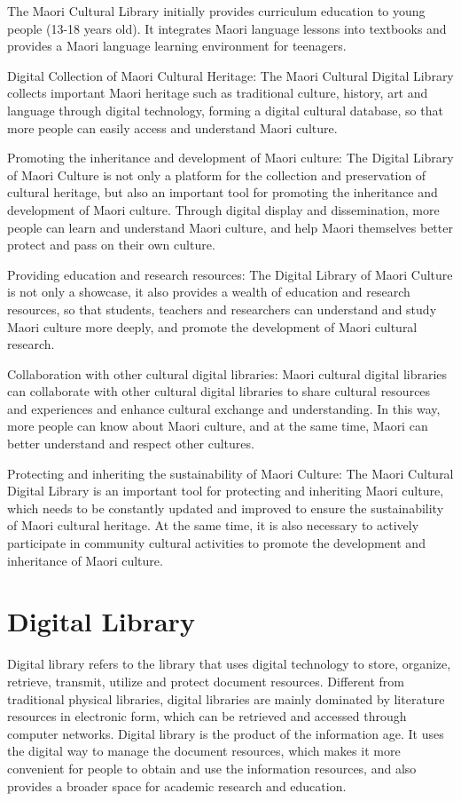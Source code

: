 The Maori Cultural Library initially provides curriculum education to young people (13-18 years old). It integrates Maori language lessons into textbooks and provides a Maori language learning environment for teenagers.

Digital Collection of Maori Cultural Heritage: The Maori Cultural Digital Library collects important Maori heritage such as traditional culture, history, art and language through digital technology, forming a digital cultural database, so that more people can easily access and understand Maori culture.

Promoting the inheritance and development of Maori culture: The Digital Library of Maori Culture is not only a platform for the collection and preservation of cultural heritage, but also an important tool for promoting the inheritance and development of Maori culture. Through digital display and dissemination, more people can learn and understand Maori culture, and help Maori themselves better protect and pass on their own culture.

Providing education and research resources: The Digital Library of Maori Culture is not only a showcase, it also provides a wealth of education and research resources, so that students, teachers and researchers can understand and study Maori culture more deeply, and promote the development of Maori cultural research.

Collaboration with other cultural digital libraries: Maori cultural digital libraries can collaborate with other cultural digital libraries to share cultural resources and experiences and enhance cultural exchange and understanding. In this way, more people can know about Maori culture, and at the same time, Maori can better understand and respect other cultures.

Protecting and inheriting the sustainability of Maori Culture: The Maori Cultural Digital Library is an important tool for protecting and inheriting Maori culture, which needs to be constantly updated and improved to ensure the sustainability of Maori cultural heritage. At the same time, it is also necessary to actively participate in community cultural activities to promote the development and inheritance of Maori culture.
 
\section{Digital Library}
Digital library refers to the library that uses digital technology to store, organize, retrieve, transmit, utilize and protect document resources. Different from traditional physical libraries, digital libraries are mainly dominated by literature resources in electronic form, which can be retrieved and accessed through computer networks. Digital library is the product of the information age. It uses the digital way to manage the document resources, which makes it more convenient for people to obtain and use the information resources, and also provides a broader space for academic research and education.

